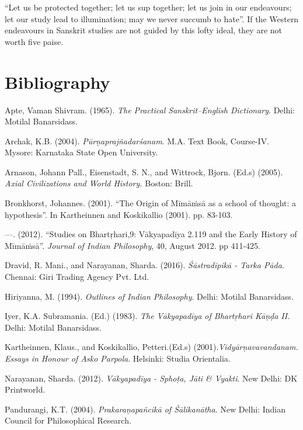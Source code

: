 “Let us be protected together; let us sup together; let us join in our endeavours; let our study lead to illumination; may we never succumb to hate”. If the Western endeavours in Sanskrit studies are not guided by this lofty ideal, they are not worth five paise.


\section*{Bibliography}

\begin{thebibliography}{99}
\itemsep=1pt
 Apte, Vaman Shivram. (1965). \textit{The Practical Sanskrit–English Dictionary}. Delhi: Motilal Banarsidass.

  Archak, K.B. (2004). \textit{Pūrṇaprajñadarśanam}. M.A. Text Book, Course-IV. Mysore: Karnataka State Open University.

  Arnason, Johann Pall., Eisenstadt, S. N., and Wittrock, Bjorn. (Ed.s) (2005). \textit{Axial Civilizations and World History.} Boston: Brill.

  Bronkhorst, Johannes. (2001). “The Origin of Mīmāṁsā as a school of thought: a hypothesis”. In Kartheinnen and Koskikallio (2001). pp. 83-103.

  —. (2012). “Studies on Bhartṛhari,9: Vākyapadīya 2.119 and the Early History of Mīmāṁsā”. \textit{Journal of Indian Philosophy}, 40, August 2012. pp 411-425.

  Dravid, R. Mani., and Narayanan, Sharda. (2016). \textit{Śāstradīpikā - Tarka Pāda}. Chennai: Giri Trading Agency Pvt. Ltd. 

  Hiriyanna, M. (1994). \textit{Outlines of Indian Philosophy}. Delhi: Motilal Banarsidass. 

  Iyer, K.A. Subramania. (Ed.) (1983). \textit{The Vākyapadīya of Bhartṛhari Kāṇḍa II.} Delhi: Motilal Banarsidass.

  Kartheinnen, Klaus., and Koskikallio, Petteri.(Ed.s) (2001).\textit{Vidyārṇavavandanam. Essays in Honour of Asko Parpola}. Helsinki: Studia Orientalia.

  Narayanan, Sharda. (2012). \textit{Vākyapadīya - Sphoṭa, Jāti \& Vyakti}. New Delhi: DK Printworld. 

  Pandurangi, K.T. (2004). \textit{Prakaraņapañcikā of Śālikanātha}. New Delhi: Indian Council for Philosophical Research.


\end{thebibliography}
